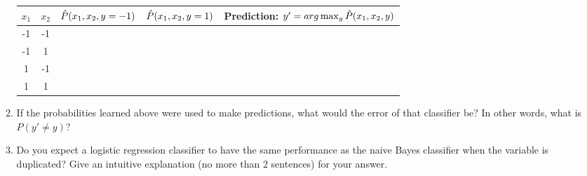 \begin{enumerate}
\begin{enumerate}
    \begin{tabular}{|c|c|c|c|c|}
      \hline
      $x_1$ & $x_2$ & $\hat{P}(x_1, x_2, y= -1)$ & $\hat{P}(x_1, x_2, y=1)$ & {\bf Prediction: $y' = arg\max_y \hat{P}(x_1, x_2, y)$} \\
      \hline
      -1    & -1    &                        &                      &                                                   \\
      -1    & 1     &                        &                      &                                                   \\
      1     & -1    &                        &                      &                                                   \\
      1     & 1     &                        &                      &                                                   \\
      \hline
    \end{tabular}

  \item \relax[3 points] If the probabilities learned above were used to
    make predictions, what would the error of that classifier be? In
    other words, what is $P(y' \ne y)$?

  \item \relax[2 points] Do you expect a logistic regression
    classifier to have the same performance as the naive Bayes
    classifier when the variable is duplicated? Give an intuitive
    explanation (no more than 2 sentences) for your answer.

  \end{enumerate}

\end{enumerate}




